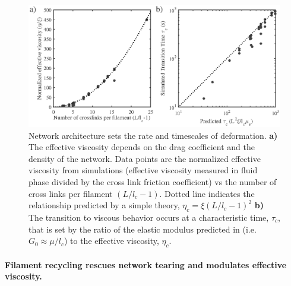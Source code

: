 \documentclass[10pt,letterpaper]{article}
\begin{document}
\begin{figure}[h!]
\centering
\includegraphics[width=\hsize]{figures/figure3b}
\caption{\label{fig:passive_form} Network architecture sets the rate and timescales of deformation. \textbf{a)} The effective viscosity depends on the drag coefficient and the density of the network. Data points are the normalized effective viscosity from simulations (effective viscosity measured in fluid phase divided by the cross link friction coefficient) vs the number of cross links per filament $(L/l_c - 1)$.  Dotted line indicates the relationship predicted by a simple theory, $\eta_c = \xi(L/l_c-1)^2$ \textbf{b)} The transition to viscous behavior occurs at a characteristic time, $\tau_c$, that is set by the ratio of the elastic modulus predicted in \cite{theo_hlm} (i.e. $G_0 \approx \mu/l_c$) to the effective viscosity, $\eta_c$.  }
\end{figure}


\paragraph{Filament recycling rescues network tearing and modulates effective viscosity.} 
 
\end{document}
